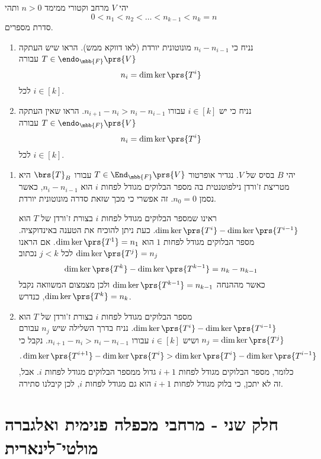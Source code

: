 \documentclass[a4paper,10pt,twoside,openany]{book}
\begin{document}
\begin{exercisechap}
יהי
$V$
מרחב וקטורי ממימד
$n > 0$
ותהי
\[0 < n_1 < n_2 < \ldots < n_{k-1} < n_k = n\]
סדרת מספרים.

\begin{enumerate}
\item נניח כי
$n_i - n_{i-1}$
מונוטונית יורדת (לאו דווקא ממש).
הראו שיש העתקה
$T \in \endo_{\mbb{F}}\prs{V}$
עבורה
\[n_i = \dim\ker\prs{T^i}\]
לכל
$i \in [k]$.

\item נניח כי יש
$i \in [k]$
עבורו
$n_{i+1} - n_i > n_i - n_{i-1}$.
הראו שאין העתקה
$T \in \endo_{\mbb{F}}\prs{V}$
עבורה
\[n_i = \dim\ker\prs{T^i}\]
לכל
$i \in [k]$.
\end{enumerate}
\end{exercisechap}

\begin{solution}
\begin{enumerate}
\item
יהי
$B$
בסיס של
$V$.
נגדיר אופרטור
$T \in \End_{\mbb{F}}\prs{V}$
עבורו
$\brs{T}_B$
היא מטריצת ז'ורדן נילפוטנטית בה מספר הבלוקים מגודל לפחות
$i$
הוא
$n_i - n_{i-1}$,
כאשר נסמן
$n_0 = 0$.
זה אפשרי כי מכך שזאת סדרה
מונוטונית יורדת.

ראינו שמספר הבלוקים מגודל לפחות
$i$
בצורת ז'ורדן של
$T$
הוא
$\dim \ker\prs{T^i} - \dim \ker \prs{T^{i-1}}$.
כעת ניתן להוכיח את הטענה באינדוקציה.
מספר הבלוקים מגודל לפחות
$1$
הוא
$\dim \ker\prs{T^1} = n_1$.
אם הראנו
$\dim \ker \prs{T^j} = n_j$
לכל
$j < k$
נכתוב
\[\dim \ker \prs{T^k} - \dim \ker\prs{T^{k-1}} = n_k - n_{k-1}\]
כאשר מההנחה
$\dim \ker \prs{T^{k-1}} = n_{k-1}$
ולכן מצמצום המשוואה נקבל
$\dim \ker \prs{T^k} = n_k$,
כנדרש.

\item
מספר הבלוקים מגודל לפחות
$i$
בצורת ז'ורדן של
$T$
הוא
$\dim \ker \prs{T^i} - \dim \ker \prs{T^{i-1}}$.
נניח בדרך השלילה שיש
$n_j$
עבורם
$n_j = \dim \ker\prs{T^j}$
ושיש
$i \in [k]$
עבורו
$n_{i+1} - n_i > n_i - n_{i-1}$.
נקבל כי
\[\text{.} \dim \ker\prs{T^{i+1}} - \dim \ker\prs{T^i} > \dim \ker\prs{T^i} - \dim \ker\prs{T^{i-1}}\]
כלומר, מספר הבלוקים מגודל לפחות
$i+1$
גדול ממספר הבלוקים מגודל לפחות
$i$.
אבל, זה לא יתכן, כי בלוק מגודל לפחות
$i+1$
הוא גם מגודל לפחות
$i$,
לכן קיבלנו סתירה.
\end{enumerate}
\end{solution}

\part{חלק שני - מרחבי מכפלה פנימית ואלגברה מולטי־לינארית}
\end{document}
